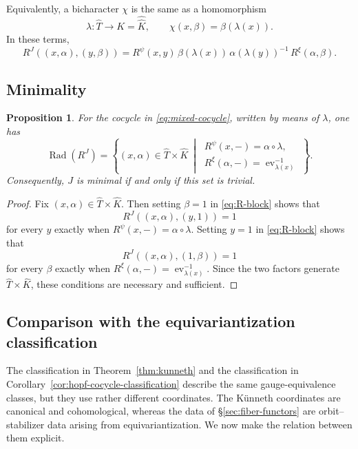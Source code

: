 \documentclass{amsart}
\newtheorem{proposition}[theorem]{Proposition}
\theoremstyle{definition}
\newcommand{\Rad}{\operatorname{Rad}}
\numberwithin{equation}{section}
\begin{document}
Equivalently, a bicharacter $\chi$ is the same as a homomorphism
\[
 \lambda:\widehat T\longrightarrow K=\widehat {\widehat K},
 \qquad
 \chi(x,\beta)=\beta(\lambda(x)).
\]
In these terms,
\begin{equation}\label{eq:R-block}
 R^J((x,\alpha),(y,\beta))
 =R^\psi(x,y)\,
 \beta(\lambda(x))\,
 \alpha(\lambda(y))^{-1}\,
 R^\xi(\alpha,\beta).
\end{equation}

\subsection{Minimality}

\begin{proposition}\label{prop:radical}
For the cocycle in \eqref{eq:mixed-cocycle}, written by means of $\lambda$, one has
\[
 \Rad(R^J)=
 \left\{
 (x,\alpha)\in \widehat T\times \widehat K\ \middle|\
 \begin{array}{l}
 R^\psi(x,-)=\alpha\circ\lambda,\\[1mm]
 R^\xi(\alpha,-)=\operatorname{ev}_{\lambda(x)}^{-1}
 \end{array}
 \right\}.
\]
Consequently, $J$ is minimal if and only if this set is trivial.
\end{proposition}

\begin{proof}
Fix $(x,\alpha)\in \widehat T\times \widehat K$. Then setting $\beta=1$ in
\eqref{eq:R-block} shows that 
$$R^J((x,\alpha),(y,1))=1$$
for every $y$ exactly when
$R^\psi(x,-)=\alpha\circ\lambda$.  Setting $y=1$ in
\eqref{eq:R-block} shows that
$$R^J((x,\alpha),(1,\beta))=1$$
for every $\beta$ exactly when
$R^\xi(\alpha,-)=\operatorname{ev}_{\lambda(x)}^{-1}$.  Since the two factors
generate $\widehat T\times \widehat K$, these conditions are necessary and sufficient.
\end{proof}

\subsection{Comparison with the equivariantization classification}
\label{subsec:kunneth-versus-equivariantization}

The classification in Theorem~\ref{thm:kunneth} and the classification in
Corollary~\ref{cor:hopf-cocycle-classification} describe the same
gauge-equivalence classes, but they use rather different coordinates.  The
K\"unneth coordinates are canonical and cohomological, whereas the data of
\S\ref{sec:fiber-functors} are orbit--stabilizer data arising from
equivariantization.  We now make the relation between them explicit.
\end{document}
